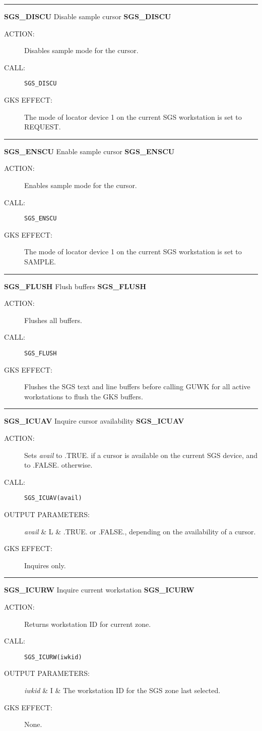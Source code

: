 \rule{\textwidth}{0.3mm}
{\Large {\bf SGS\_DISCU} \hfill Disable sample cursor \hfill {\bf SGS\_DISCU}}
\begin{description}
\item [ACTION:]
Disables sample mode for the cursor.
\item [CALL:]
{\tt SGS\_DISCU}
\item [GKS EFFECT:]
The mode of locator device 1 on the current SGS workstation is set to REQUEST.
\end{description}
\goodbreak

\rule{\textwidth}{0.3mm}
{\Large {\bf SGS\_ENSCU} \hfill Enable sample cursor \hfill {\bf SGS\_ENSCU}}
\begin{description}
\item [ACTION:]
Enables sample mode for the cursor.
\item [CALL:]
{\tt SGS\_ENSCU}
\item [GKS EFFECT:]
The mode of locator device 1 on the current SGS workstation is set to SAMPLE.
\end{description}
\goodbreak

\rule{\textwidth}{0.3mm}
{\Large {\bf SGS\_FLUSH} \hfill Flush buffers \hfill {\bf SGS\_FLUSH}}
\begin{description}
\item [ACTION:]
Flushes all buffers.
\item [CALL:]
{\tt SGS\_FLUSH}
\item [GKS EFFECT:]
Flushes the SGS text and line buffers before calling GUWK for all active
workstations to flush the GKS buffers.
\end{description}
\goodbreak

\rule{\textwidth}{0.3mm}
{\Large {\bf SGS\_ICUAV} \hfill Inquire cursor availability \hfill {\bf SGS\_ICUAV}}
\begin{description}
\item [ACTION:]
Sets {\em avail} to .TRUE. if a cursor is available on the current SGS device,
and to .FALSE. otherwise.
\item [CALL:]
{\tt SGS\_ICUAV(avail)}
\item [OUTPUT PARAMETERS:]
\begin{params}
{\em avail}  & L  & .TRUE. or .FALSE., depending on the availability of a
cursor.
\end{params}
\item [GKS EFFECT:]
Inquires only.
\end{description}
\goodbreak

\rule{\textwidth}{0.3mm}
{\Large {\bf SGS\_ICURW} \hfill Inquire current workstation \hfill {\bf SGS\_ICURW}}
\begin{description}
\item [ACTION:]
Returns workstation ID for current zone.
\item [CALL:]
{\tt SGS\_ICURW(iwkid)}
\item [OUTPUT PARAMETERS:]
\begin{params}
{\em iwkid}  & I  & The workstation ID for the SGS zone last selected.
\end{params}
\item [GKS EFFECT:]
None.
\end{description}
\goodbreak


